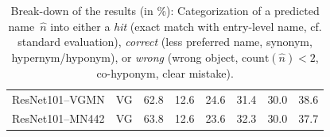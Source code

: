 \begin{table}[t]
\begin{tabular}{l|l|r@{~}r@{~}r@{~}||r@{~}r@{~}r@{~}}
	ResNet101--VGMN & VG %
	 &         62.8 &                  12.6 &                    24.6 &         31.4 &                  30.0 &                    38.6 \\
	ResNet101--MN442 & VG %
	 &         63.8 &                  12.6 &                    23.6 &         32.3 &                  30.0 &                    37.7 \\
	\bottomrule
\end{tabular}
\caption{Break-down of the results (in \%): Categorization of a predicted name\ $\hat{n}$ into either a \textit{hit} (exact match with entry-level name, cf. standard evaluation), \textit{correct} (less preferred name, synonym, hypernym/hyponym), or \textit{wrong} (wrong object, $\text{count}(\hat{n})<2$, co-hyponym, clear mistake). \label{tab:exp_overview_results}}
\end{table}

